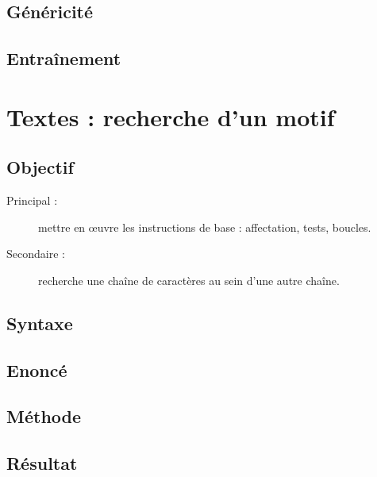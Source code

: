 \subsection{Généricité}\label{instructions:jeux:genericite}

\subsection{Entraînement}\label{instructions:jeux:entrainement}


\section{Textes : recherche d'un motif}\label{instructions:textes}

\subsection{Objectif}\label{instructions:textes:objectif}
\begin{description}
\item[Principal : ] mettre en \oe uvre les instructions de base : affectation, tests, boucles.
\item[Secondaire :] recherche une chaîne de caractères au sein d'une autre chaîne.
\end{description}


\subsection{Syntaxe \python}\label{instructions:textes:python}

\subsection{Enoncé}\label{instructions:textes:enonce}

\subsection{Méthode}\label{instructions:textes:methode}

\subsection{Résultat}\label{instructions:textes:resultat}

